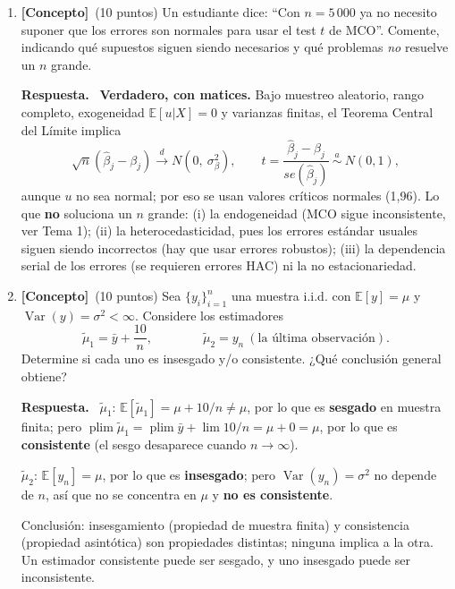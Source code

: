 \documentclass[12pt,letterpaper]{article}
\DeclareMathOperator{\var}{Var}
\DeclareMathOperator{\plim}{plim}
\newcommand{\E}[1]{\mathbb{E}\left[#1\right]}
\newenvironment{resp}{\begingroup\color{blue}\par\noindent\textbf{Respuesta.}\ }{\par\endgroup}
\newcommand{\conc}{\textbf{[Concepto]}}
\begin{document}
\begin{enumerate}[1.]

\item \conc\ (10 puntos) Un estudiante dice: ``Con $n=5\,000$ ya no necesito suponer que los errores son normales para usar el test $t$ de MCO''. Comente, indicando qué supuestos siguen siendo necesarios y qué problemas \emph{no} resuelve un $n$ grande.

\begin{resp}
\textbf{Verdadero, con matices.} Bajo muestreo aleatorio, rango completo, exogeneidad $\E{u|X}=0$ y varianzas finitas, el Teorema Central del Límite implica
\[
\sqrt n(\hat\beta_j-\beta_j)\xrightarrow{d}N(0,\ \sigma^2_\beta),\qquad t=\frac{\hat\beta_j-\beta_j}{se(\hat\beta_j)}\ \overset{a}{\sim}\ N(0,1),
\]
aunque $u$ no sea normal; por eso se usan valores críticos normales (1,96). Lo que \textbf{no} soluciona un $n$ grande: (i) la endogeneidad (MCO sigue inconsistente, ver Tema 1); (ii) la heterocedasticidad, pues los errores estándar usuales siguen siendo incorrectos (hay que usar errores robustos); (iii) la dependencia serial de los errores (se requieren errores HAC) ni la no estacionariedad.
\end{resp}

\item \conc\ (10 puntos) Sea $\{y_i\}_{i=1}^n$ una muestra i.i.d. con $\E{y}=\mu$ y $\var(y)=\sigma^2<\infty$. Considere los estimadores
\[
\tilde\mu_1=\bar y+\frac{10}{n},\qquad\qquad \tilde\mu_2=y_n\ (\text{la última observación}).
\]
Determine si cada uno es insesgado y/o consistente. ¿Qué conclusión general obtiene?

\begin{resp}
$\tilde\mu_1$: $\E{\tilde\mu_1}=\mu+10/n\neq\mu$, por lo que es \textbf{sesgado} en muestra finita; pero $\plim\tilde\mu_1=\plim\bar y+\lim 10/n=\mu+0=\mu$, por lo que es \textbf{consistente} (el sesgo desaparece cuando $n\to\infty$).

$\tilde\mu_2$: $\E{y_n}=\mu$, por lo que es \textbf{insesgado}; pero $\var(y_n)=\sigma^2$ no depende de $n$, así que no se concentra en $\mu$ y \textbf{no es consistente}.

Conclusión: insesgamiento (propiedad de muestra finita) y consistencia (propiedad asintótica) son propiedades distintas; ninguna implica a la otra. Un estimador consistente puede ser sesgado, y uno insesgado puede ser inconsistente.
\end{resp}


\end{enumerate}
\end{document}
